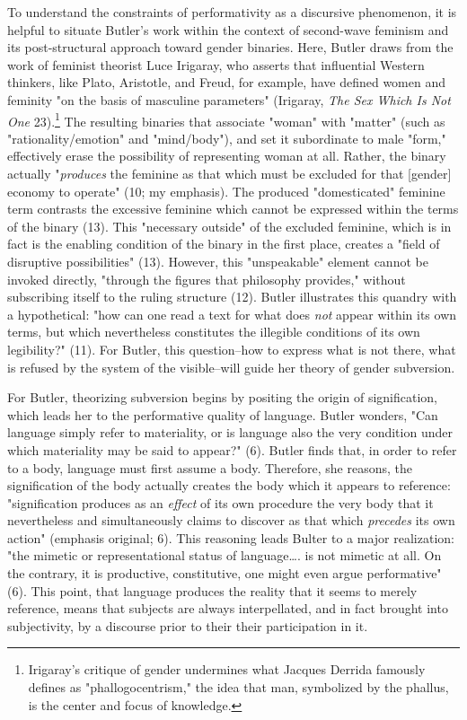 \documentclass[11pt]{article}
\begin{document}
To understand the constraints of performativity as a discursive
phenomenon, it is helpful to situate Butler's work within the context
of second-wave feminism and its post-structural approach toward gender
binaries. Here, Butler draws from the work of feminist theorist Luce
Irigaray, who asserts that influential Western thinkers, like Plato,
Aristotle, and Freud, for example, have defined women and feminity "on
the basis of masculine parameters" (Irigaray, \emph{The Sex Which Is Not
One} 23).\footnote{Irigaray's critique of gender undermines what Jacques Derrida
famously defines as "phallogocentrism," the idea that man, symbolized
by the phallus, is the center and focus of knowledge.} The resulting binaries that associate "woman" with
"matter" (such as "rationality/emotion" and "mind/body"), and set it
subordinate to male "form," effectively erase the possibility of
representing woman at all. Rather, the binary actually "\emph{produces} the
feminine as that which must be excluded for that [gender] economy to
operate" (10; my emphasis). The produced "domesticated" feminine term
contrasts the excessive feminine which cannot be expressed within the
terms of the binary (13). This "necessary outside" of the excluded
feminine, which is in fact is the enabling condition of the binary in
the first place, creates a "field of disruptive possibilities"
(13). However, this "unspeakable" element cannot be invoked directly,
"through the figures that philosophy provides," without subscribing
itself to the ruling structure (12). Butler illustrates this quandry
with a hypothetical: "how can one read a text for what does \emph{not}
appear within its own terms, but which nevertheless constitutes the
illegible conditions of its own legibility?" (11). For Butler, this
question--how to express what is not there, what is refused by the
system of the visible--will guide her theory of gender subversion.

For Butler, theorizing subversion begins by positing the origin of
signification, which leads her to the performative quality of
language. Butler wonders, "Can language simply refer to materiality,
or is language also the very condition under which materiality may be
said to appear?" (6). Butler finds that, in order to refer to a body,
language must first assume a body. Therefore, she reasons, the
signification of the body actually creates the body which it appears
to reference: "signification produces as an \emph{effect} of its own
procedure the very body that it nevertheless and simultaneously claims
to discover as that which \emph{precedes} its own action" (emphasis
original; 6). This reasoning leads Bulter to a major realization: "the
mimetic or representational status of language\ldots{}. is not mimetic at
all. On the contrary, it is productive, constitutive, one might even
argue performative" (6). This point, that language produces the
reality that it seems to merely reference, means that subjects are
always interpellated, and in fact brought into subjectivity, by a
discourse prior to their their participation in it.
\end{document}

